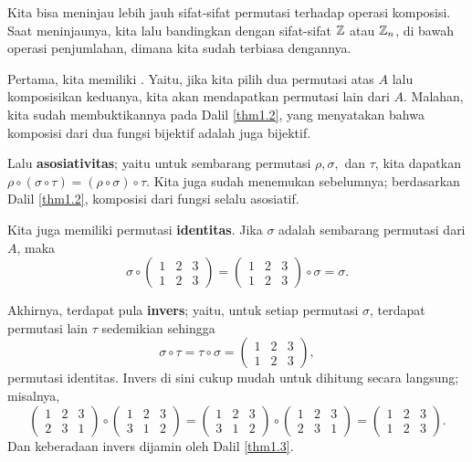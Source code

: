 Kita bisa meninjau lebih jauh sifat-sifat permutasi terhadap operasi komposisi. Saat meninjaunya, kita lalu bandingkan dengan sifat-sifat $\mathbb{Z}$ atau $\mathbb{Z}_n$, di bawah operasi penjumlahan, dimana kita sudah terbiasa dengannya.

Pertama, kita memiliki . Yaitu, jika kita pilih dua permutasi atas $A$ lalu komposisikan keduanya, kita akan mendapatkan permutasi lain dari $A$. Malahan, kita sudah membuktikannya pada Dalil \ref{thm1.2}, yang menyatakan bahwa komposisi dari dua fungsi bijektif adalah juga bijektif.

Lalu \textbf{asosiativitas}; yaitu untuk sembarang permutasi $\rho, \sigma,$ dan $\tau$, kita dapatkan $\rho \circ (\sigma \circ \tau) = (\rho \circ \sigma) \circ \tau$. Kita juga sudah menemukan sebelumnya; berdasarkan Dalil \ref{thm1.2}, komposisi dari fungsi selalu asosiatif.

Kita juga memiliki permutasi \textbf{identitas}. Jika $\sigma$ adalah sembarang permutasi dari $A$, maka
\[ \sigma \circ \begin{pmatrix}
1 & 2 & 3 \\
1 & 2 & 3
\end{pmatrix} = \begin{pmatrix}
1 & 2 & 3 \\
1 & 2 & 3
\end{pmatrix} \circ \sigma = \sigma.
\]

Akhirnya, terdapat pula \textbf{invers}; yaitu, untuk setiap permutasi $\sigma$, terdapat permutasi lain $\tau$ sedemikian sehingga
\[ \sigma \circ \tau = \tau \circ \sigma = \begin{pmatrix}
1 & 2 & 3 \\
1 & 2 & 3
\end{pmatrix},
\]
permutasi identitas. Invers di sini cukup mudah untuk dihitung secara langsung; misalnya,
\[\begin{pmatrix}
1 & 2 & 3 \\
2 & 3 & 1
\end{pmatrix} \circ \begin{pmatrix}
1 & 2 & 3 \\
3 & 1 & 2
\end{pmatrix} = \begin{pmatrix}
1 & 2 & 3 \\
3 & 1 & 2
\end{pmatrix} \circ \begin{pmatrix}
1 & 2 & 3 \\
2 & 3 & 1
\end{pmatrix} = \begin{pmatrix}
1 & 2 & 3 \\
1 & 2 & 3
\end{pmatrix}.
\]
Dan keberadaan invers dijamin oleh Dalil \ref{thm1.3}.

